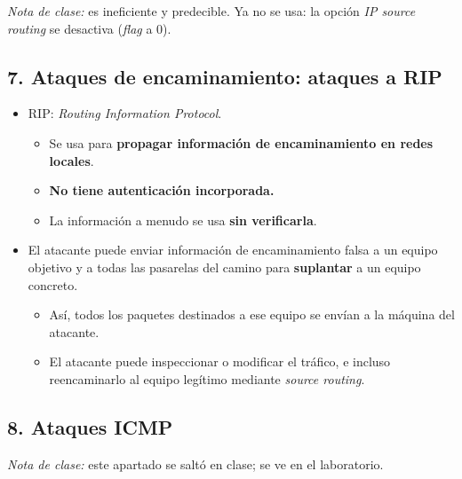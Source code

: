 \documentclass[11pt,a4paper]{report}
\begin{document}
\noindent\emph{Nota de clase:} es ineficiente y predecible. Ya no se usa: la opción \emph{IP source routing} se desactiva (\emph{flag} a 0).
 
\subsection{7. Ataques de encaminamiento: ataques a RIP}
 
\begin{itemize}
  \item RIP: \emph{Routing Information Protocol}.
    \begin{itemize}
      \item Se usa para \textbf{propagar información de encaminamiento en redes locales}.
      \item \textbf{No tiene autenticación incorporada.}
      \item La información a menudo se usa \textbf{sin verificarla}.
    \end{itemize}
  \item El atacante puede enviar información de encaminamiento falsa a un equipo objetivo y a todas las pasarelas del camino para \textbf{suplantar} a un equipo concreto.
    \begin{itemize}
      \item Así, todos los paquetes destinados a ese equipo se envían a la máquina del atacante.
      \item El atacante puede inspeccionar o modificar el tráfico, e incluso reencaminarlo al equipo legítimo mediante \emph{source routing}.
    \end{itemize}
\end{itemize}
 
\subsection{8. Ataques ICMP}
 
\noindent\emph{Nota de clase:} este apartado se saltó en clase; se ve en el laboratorio.
 
\end{document}
